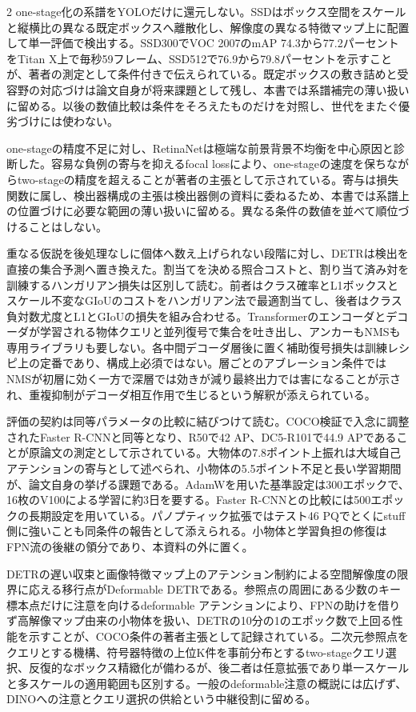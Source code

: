 \documentclass[lualatex,a4paper,10pt]{jlreq}
\begin{document}
\begin{multicols}{2}
\noindent one-stage化の系譜をYOLOだけに還元しない。SSDはボックス空間をスケールと縦横比の異なる既定ボックスへ離散化し、解像度の異なる特徴マップ上に配置して単一評価で検出する。SSD300でVOC 2007のmAP 74.3から77.2パーセントをTitan X上で毎秒59フレーム、SSD512で76.9から79.8パーセントを示すことが、著者の測定として条件付きで伝えられている。既定ボックスの敷き詰めと受容野の対応づけは論文自身が将来課題として残し、本書では系譜補完の薄い扱いに留める。以後の数値比較は条件をそろえたものだけを対照し、世代をまたぐ優劣づけには使わない。\autocite{vmd008}\par\medskip
\noindent one-stageの精度不足に対し、RetinaNetは極端な前景背景不均衡を中心原因と診断した。容易な負例の寄与を抑えるfocal lossにより、one-stageの速度を保ちながらtwo-stageの精度を超えることが著者の主張として示されている。寄与は損失関数に属し、検出器構成の主張は検出器側の資料に委ねるため、本書では系譜上の位置づけに必要な範囲の薄い扱いに留める。異なる条件の数値を並べて順位づけることはしない。\autocite{vmd009}\par\medskip
\noindent 重なる仮説を後処理なしに個体へ数え上げられない段階に対し、DETRは検出を直接の集合予測へ置き換えた。割当てを決める照合コストと、割り当て済み対を訓練するハンガリアン損失は区別して読む。前者はクラス確率とL1ボックスとスケール不変なGIoUのコストをハンガリアン法で最適割当てし、後者はクラス負対数尤度とL1とGIoUの損失を組み合わせる。Transformerのエンコーダとデコーダが学習される物体クエリと並列復号で集合を吐き出し、アンカーもNMSも専用ライブラリも要しない。各中間デコーダ層後に置く補助復号損失は訓練レシピ上の定番であり、構成上必須ではない。層ごとのアブレーション条件ではNMSが初層に効く一方で深層では効きが減り最終出力では害になることが示され、重複抑制がデコーダ相互作用で生じるという解釈が添えられている。\autocite{vmd010}\par\medskip
\noindent 評価の契約は同等パラメータの比較に結びつけて読む。COCO検証で入念に調整されたFaster R-CNNと同等となり、R50で42 AP、DC5-R101で44.9 APであることが原論文の測定として示されている。大物体の7.8ポイント上振れは大域自己アテンションの寄与として述べられ、小物体の5.5ポイント不足と長い学習期間が、論文自身の挙げる課題である。AdamWを用いた基準設定は300エポックで、16枚のV100による学習に約3日を要する。Faster R-CNNとの比較には500エポックの長期設定を用いている。パノプティック拡張ではテスト46 PQでとくにstuff側に強いことも同条件の報告として添えられる。小物体と学習負担の修復はFPN流の後継の領分であり、本資料の外に置く。\autocite{vmd010}\par\medskip
\noindent DETRの遅い収束と画像特徴マップ上のアテンション制約による空間解像度の限界に応える移行点がDeformable DETRである。参照点の周囲にある少数のキー標本点だけに注意を向けるdeformable アテンションにより、FPNの助けを借りず高解像マップ由来の小物体を扱い、DETRの10分の1のエポック数で上回る性能を示すことが、COCO条件の著者主張として記録されている。二次元参照点をクエリとする機構、符号器特徴の上位K件を事前分布とするtwo-stageクエリ選択、反復的なボックス精緻化が備わるが、後二者は任意拡張であり単一スケールと多スケールの適用範囲も区別する。一般のdeformable注意の概説には広げず、DINOへの注意とクエリ選択の供給という中継役割に留める。\autocite{vmd123}\par\medskip

\end{multicols}
\end{document}
